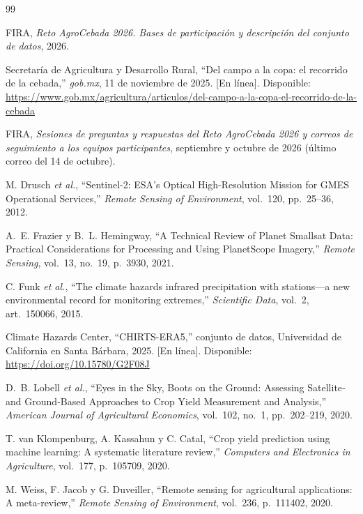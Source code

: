 \begin{thebibliography}{99}

FIRA, \emph{Reto AgroCebada 2026. Bases de participación y descripción del conjunto de datos},
  2026.

Secretaría de Agricultura y Desarrollo Rural, ``Del campo a la copa: el recorrido de la cebada,'' \emph{gob.mx}, 11 de noviembre de 2025. [En línea]. Disponible: \url{https://www.gob.mx/agricultura/articulos/del-campo-a-la-copa-el-recorrido-de-la-cebada}

FIRA, \emph{Sesiones de preguntas y respuestas del Reto AgroCebada 2026 y correos de seguimiento a los equipos participantes}, septiembre y octubre de 2026 (último correo del 14 de octubre).

M. Drusch \emph{et al.}, ``Sentinel-2: ESA's Optical High-Resolution Mission for GMES Operational Services,'' \emph{Remote Sensing of Environment}, vol.~120, pp.~25--36, 2012.

A.~E. Frazier y B.~L. Hemingway, ``A Technical Review of Planet Smallsat Data: Practical Considerations for Processing and Using PlanetScope Imagery,'' \emph{Remote Sensing}, vol.~13, no.~19, p.~3930, 2021.

C. Funk \emph{et al.}, ``The climate hazards infrared precipitation with stations---a new environmental record for monitoring extremes,'' \emph{Scientific Data}, vol.~2, art.~150066, 2015.

Climate Hazards Center, ``CHIRTS-ERA5,'' conjunto de datos, Universidad de California en Santa Bárbara, 2025.
[En línea]. Disponible: \url{https://doi.org/10.15780/G2F08J}

D.~B. Lobell \emph{et al.}, ``Eyes in the Sky, Boots on the Ground: Assessing Satellite‐ and Ground‐Based Approaches to Crop Yield Measurement and Analysis,'' \emph{American Journal of Agricultural Economics}, vol.~102, no.~1, pp.~202--219, 2020.

T. van Klompenburg, A. Kassahun y C. Catal, ``Crop yield prediction using machine learning: A systematic literature review,'' \emph{Computers and Electronics in Agriculture}, vol.~177, p.~105709, 2020.

M. Weiss, F. Jacob y G. Duveiller, ``Remote sensing for agricultural applications: A meta-review,'' \emph{Remote Sensing of Environment}, vol.~236, p.~111402, 2020.


\end{thebibliography}

